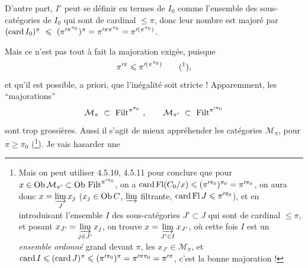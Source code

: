 D'autre part, $I'$ peut se définir en termes de $I_0$ comme l'ensemble des sous-catégories de $I_0$ qui sont de cardinal $\leqslant \pi$, donc leur nombre est majoré par $(\operatorname{card} I_0)^\pi \ \leqslant \ (\pi'^{\pi^{\pi_0}})^\pi = \pi'^{\pi\pi^{\pi_0}} = \pi'^{(\pi^{\pi_0})}$.

Mais ce n'est pas tout à fait la majoration exigée, puisque
\[
\pi'^{\pi} \leqslant \pi'^{(\pi^{\pi_0})} \qquad \text{(\footnotemark)},
\]
%
et qu'il est possible, a priori, que l'inégalité
soit stricte ! Apparemment, les ``majorations''
\[
\mathcal{M}_\pi \ \subset \ \Filt^{\pi^{\pi_0}} \ , \qquad \mathcal{M}_{\pi'} \ \subset \ \Filt^{\pi'^{\pi_0}}
\]
sont trop grossières. Aussi il s'agit de mieux appréhender les catégories $\mathcal{M}_\pi$, pour $\pi \geqslant \pi_0$ (\footnote{Mais on peut utiliser 4.5.10, 4.5.11 pour conclure que pour $x \in \mathrm{Ob}\, \mathcal{M}_{\pi'} \subset \mathrm{Ob}\, \operatorname{Filt}^{\pi'^{\pi_0}}$, on a $\operatorname{card} \operatorname{Fl}(C_0/x) \leqslant (\pi'^{\pi_0})^{\pi_0} = \pi'^{\pi_0}$, on aura donc $x = \varinjlim\limits_{J} x_j$ ($x_j \in \mathrm{Ob}\, C$, $\varinjlim$ filtrante, $\operatorname{card} \operatorname{Fl} J \leqslant \pi'^{\pi_0}$), et en introduisant l'ensemble $I$ des sous-catégories $J' \subset J$ qui sont de cardinal $\leqslant \pi$, et posant $x_{J'} = \varinjlim\limits_{j \in J'} x_j$, on trouve $x = \varinjlim\limits_{J' \in I} x_{J'}$, où cette fois $I$ est un \textit{ensemble ordonné} grand devant $\pi$, les $x_{J'} \in \mathcal{M}_\pi$, et $\operatorname{card} I \leqslant (\operatorname{card} J)^\pi \leqslant (\pi'^{\pi_0})^\pi = \pi'^{\pi\pi_0} = \pi'^{\pi}$, c'est la bonne majoration !}). Je vais hasarder une

